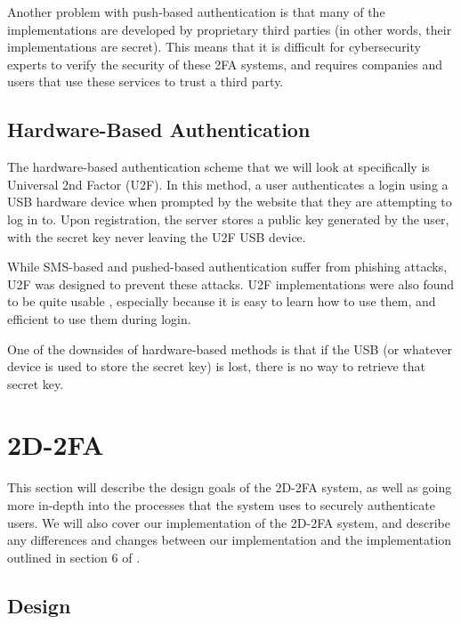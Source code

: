 \documentclass[11pt]{article}
\begin{document}
Another problem with push-based authentication is that many of the
implementations are developed by proprietary third parties (in other
words, their implementations are secret). This means that it is
difficult for cybersecurity experts to verify the security of these 2FA
systems, and requires companies and users that use these services to
trust a third party.

\subsection{Hardware-Based Authentication}

The hardware-based authentication scheme that we will look at
specifically is Universal 2nd Factor (U2F). In this method, a user
authenticates a login using a USB hardware device when prompted by the
website that they are attempting to log in to. Upon registration, the
server stores a public key generated by the user, with the secret key
never leaving the U2F USB device. 

While SMS-based and pushed-based authentication suffer from phishing
attacks, U2F was designed to prevent these attacks. U2F implementations
were also found to be quite usable \cite{lang2017security}, especially
because it is easy to learn how to use them, and efficient to use them
during login. 

One of the downsides of hardware-based methods is that if the USB (or
whatever device is used to store the secret key) is lost, there is no
way to retrieve that secret key. 

\section{2D-2FA}

This section will describe the design goals of the 2D-2FA system, as
well as going more in-depth into the processes that the system uses to
securely authenticate users. We will also cover our implementation of
the 2D-2FA system, and describe any differences and changes between our
implementation and the implementation outlined in section 6 of
\cite{shirvanian2d2fa}. 


\subsection{Design}
\end{document}

